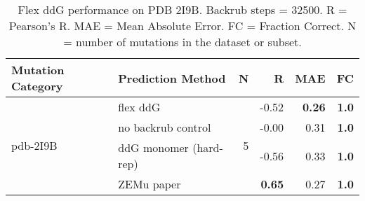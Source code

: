 \begin{table}
  \begin{tabular}{llrrrr}
\toprule
Mutation Category &       Prediction Method &  N &     R &  MAE &  FC \\
\midrule
 \multirow{ 4}{*}{pdb-2I9B} & flex ddG & \multirow{ 4}{*}{5} & -0.52 & \textbf{0.26} & \textbf{1.0}  \\
 & no backrub control & & -0.00 & 0.31 & \textbf{1.0}  \\
 & ddG monomer (hard-rep) & & -0.56 & 0.33 & \textbf{1.0}  \\
 & ZEMu paper & & \textbf{0.65} & 0.27 & \textbf{1.0}  \\
\bottomrule
\end{tabular}
  \caption[Flex ddG performance on PDB 2I9B]{
    Flex ddG performance on PDB 2I9B. Backrub steps = 32500. R = Pearson's R. MAE = Mean Absolute Error. FC = Fraction Correct. N = number of mutations in the dataset or subset.
  } \label{tab:table-pdb-2I9B}
\end{table}
